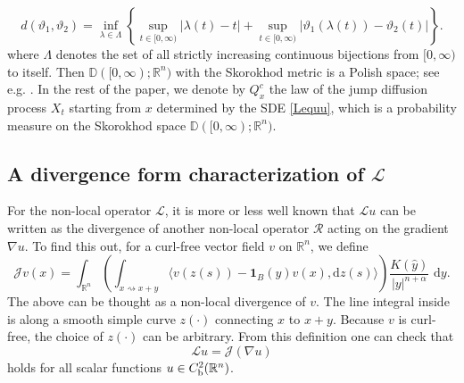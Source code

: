\documentclass[11pt,reqno]{amsart}
\theoremstyle{definition}
\theoremstyle{remark}
\numberwithin{equation}{section}
\newcommand{\R}{{\mathbb{R}}}
\begin{document}
\begin{equation*}
d(\vartheta_1, \vartheta_2)=\inf_{\lambda \in \Lambda} \left\{ \sup_{t \in [0,\infty)}|\lambda(t) - t| + \sup_{t \in [0,\infty)}\left| \vartheta_{1}(\lambda(t))-\vartheta_{2}(t)\right| \right\}.
\end{equation*}
where $\Lambda$ denotes the set of all strictly increasing continuous bijections from $[0,\infty)$ to itself.
Then $\mathbb{D}([0,\infty);\mathbb{R}^{n})$ with the Skorokhod metric is a Polish space; see e.g. \cite[Section VI.1]{JS13}. In the rest of the paper, we denote by $Q^{c}_{x}$ the law of the jump diffusion process $X_{t}$ starting from $x$ determined by the SDE \eqref{Lequu}, which is a probability measure on the Skorokhod space $\mathbb{D}([0,\infty);\mathbb{R}^{n})$.


\subsection{A divergence form characterization of $\mathscr{L}$} 

For the non-local operator $\mathscr{L}$, it is more or less well known that $\mathscr{L}u$ can be written as the divergence of another non-local operator $\mathcal{R}$ acting on the gradient $\nabla u$. To find this out, for a curl-free vector field $v$ on $\R^n$, we define
\begin{equation}
    \label{eq:nldivRn}
    \mathscr{J}v(x) = \int_{\R^n} \left(\int_{x\rightsquigarrow x+y} \langle v(z(s)) - \mathbf{1}_B(y) v(x), \mathrm{d}z(s)\rangle\right)\frac{K(\hat{y})}{|y|^{n+\alpha}}\,\,\mathrm{d}y.
\end{equation}
The above can be thought as a non-local divergence of $v$. The line integral inside is along a smooth simple curve $z(\cdot)$ connecting $x$ to $x+y$. Because $v$ is curl-free, the choice of $z(\cdot)$ can be arbitrary. From this definition one can check that
\begin{equation}
\label{eq:JLRn}
\mathscr{L} u = \mathscr{J}(\nabla u)
\end{equation}
holds for all scalar functions $u\in C^2_{\rm b}(\R^n)$.
\end{document}
